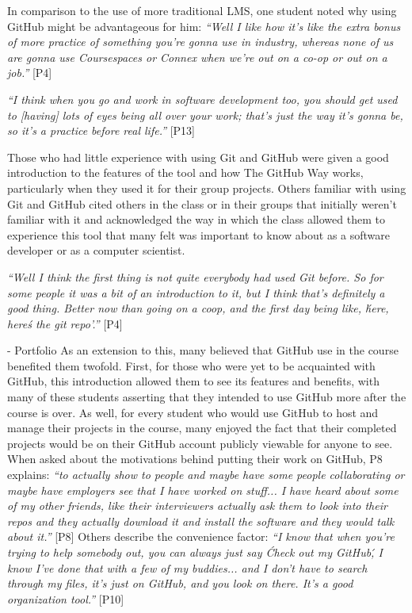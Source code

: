 In comparison to the use of more traditional LMS, one student noted why using GitHub might be advantageous for him: \textit{``Well I like how it's like the extra bonus of more practice of something you're gonna use in industry, whereas none of us are gonna use Coursespaces or Connex when we're out on a co-op or out on a job.''} [P4]

\textit{``I think when you go and work in software development too, you should get used to [having] lots of eyes being all over your work; that's just the way it's gonna be, so it's a practice before real life.''} [P13]

Those who had little experience with using Git and GitHub were given a good introduction to the features of the tool and how The GitHub Way works, particularly when they used it for their group projects. Others familiar with using Git and GitHub cited others in the class or in their groups that initially weren't familiar with it and acknowledged the way in which the class allowed them to experience this tool that many felt was important to know about as a software developer or as a computer scientist.

\textit{``Well I think the first thing is not quite everybody had used Git before. So for some people it was a bit of an introduction to it, but I think that's definitely a good thing. Better now than going on a coop, and the first day being like, \'here, here\'s the git repo'.''} [P4]

- Portfolio
As an extension to this, many believed that GitHub use in the course benefited them twofold. First, for those who were yet to be acquainted with GitHub, this introduction allowed them to see its features and benefits, with many of these students asserting that they intended to use GitHub more after the course is over. As well, for every student who would use GitHub to host and manage their projects in the course, many enjoyed the fact that their completed projects would be on their GitHub account publicly viewable for anyone to see. When asked about the motivations behind putting their work on GitHub, P8 explains: \textit{``to actually show to people and maybe have some people collaborating or maybe have employers see that I have worked on stuff... I have heard about some of my other friends, like their interviewers actually ask them to look into their repos and they actually download it and install the software and they would talk about it.''} [P8] Others describe the convenience factor: \textit{``I know that when you're trying to help somebody out, you can always just say \'Check out my GitHub\', I know I've done that with a few of my buddies... and I don't have to search through my files, it's just on GitHub, and you look on there. It's a good organization tool.''} [P10]

